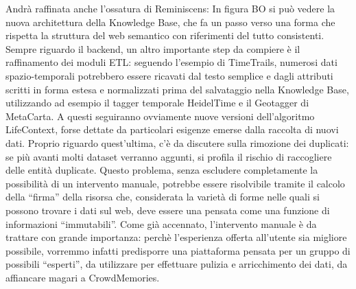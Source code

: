 \documentclass[sigproc-sp.tex]{subfiles}
\begin{document}
Andrà raffinata anche l’ossatura di Reminiscens: In figura BO si può vedere la nuova architettura della Knowledge Base, che fa un passo verso una forma che rispetta la struttura del web semantico con riferimenti del tutto consistenti. Sempre riguardo il backend, un altro importante step da compiere è il raffinamento dei moduli ETL: seguendo l’esempio di TimeTrails, numerosi dati spazio-temporali potrebbero essere ricavati dal testo semplice e dagli attributi scritti in forma estesa e normalizzati prima del salvataggio nella Knowledge Base, utilizzando ad esempio il tagger temporale HeidelTime e il Geotagger di MetaCarta. A questi seguiranno ovviamente nuove versioni dell’algoritmo LifeContext, forse dettate da particolari esigenze emerse dalla raccolta di nuovi dati. Proprio riguardo quest’ultima, c’è da discutere sulla rimozione dei duplicati: se più avanti molti dataset verranno aggunti, si profila il rischio di raccogliere delle entità duplicate. Questo problema, senza escludere completamente la possibilità di un intervento manuale, potrebbe essere risolvibile tramite il calcolo della “firma” della risorsa che, considerata la varietà di forme nelle quali si possono trovare i dati sul web, deve essere una pensata come una funzione di informazioni “immutabili”. Come già accennato, l’intervento manuale è da trattare con grande importanza: perchè l’esperienza offerta all’utente sia migliore possibile, vorremmo infatti predisporre una piattaforma pensata per un gruppo di possibili “esperti”, da utilizzare per effettuare pulizia e arricchimento dei dati, da affiancare magari a CrowdMemories.
\end{document}
